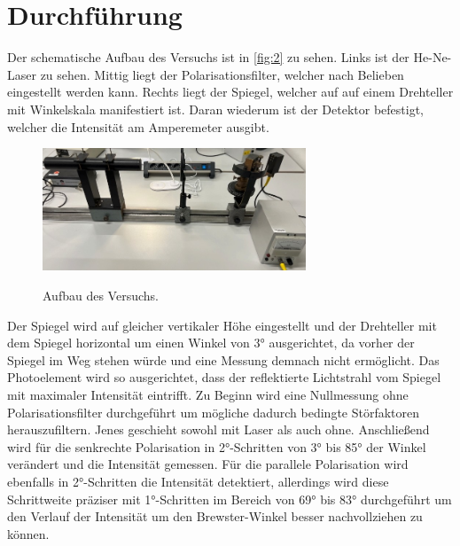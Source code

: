 \section{Durchführung}
\label{sec:Durchführung}

Der schematische Aufbau des Versuchs ist in \autoref{fig:2} zu sehen. Links 
ist der He-Ne-Laser zu sehen. Mittig liegt der Polarisationsfilter, welcher
nach Belieben eingestellt werden kann. Rechts liegt der Spiegel, welcher auf
auf einem Drehteller mit Winkelskala manifestiert ist. Daran wiederum ist der 
Detektor befestigt, welcher die Intensität am Amperemeter ausgibt.
\begin{figure}[H]
    \caption{Aufbau des Versuchs.}
    \centering
    \includegraphics[width=0.7\textwidth]{"Bilder/aufbau.jpg"}
    \label{fig:2}
\end{figure}
\noindent Der Spiegel wird auf gleicher vertikaler Höhe eingestellt und der Drehteller 
mit dem Spiegel horizontal um einen Winkel von 3° ausgerichtet, da vorher der 
Spiegel im Weg stehen würde und eine Messung demnach nicht ermöglicht. Das 
Photoelement wird so ausgerichtet, dass der reflektierte Lichtstrahl vom Spiegel
mit maximaler Intensität eintrifft.
Zu Beginn wird eine Nullmessung ohne Polarisationsfilter durchgeführt um
mögliche dadurch bedingte Störfaktoren herauszufiltern. Jenes geschieht sowohl 
mit Laser als auch ohne. Anschließend wird 
für die senkrechte Polarisation in 2°-Schritten von 3° bis 85° der Winkel
verändert und die Intensität gemessen. Für die parallele Polarisation wird 
ebenfalls in 2°-Schritten die Intensität detektiert, allerdings wird diese 
Schrittweite präziser mit 1°-Schritten im Bereich von 69° bis 83° durchgeführt 
um den Verlauf der Intensität um den Brewster-Winkel besser nachvollziehen zu 
können. 